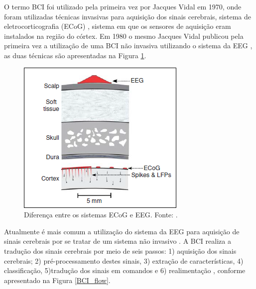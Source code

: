 O termo BCI foi utilizado pela primeira vez por Jacques Vidal em 1970, onde foram utilizadas técnicas invasivas para aquisição dos sinais cerebrais, sistema de eletrocorticografia (ECoG) \cite{BCIWolpaw}, sistema em que os sensores de aquisição eram instalados na região do córtex. Em 1980 o mesmo Jacques Vidal publicou pela primeira vez a utilização de uma BCI não invasiva utilizando o sistema da EEG \cite{CristophBCI}, as duas técnicas são apresentadas na Figura \ref{ECoGeEEG}.
\pagebreak


\begin{figure}[h]
	\centering
	\includegraphics[keepaspectratio=true,scale=1.0]{figuras/sistemas_de_aquisicao.PNG}
	\caption{Diferença entre os sistemas ECoG e EEG. Fonte: \cite{BCIWolpaw}.}
	\label{ECoGeEEG}
\end{figure}

Atualmente é mais comum a utilização do sistema da EEG para aquisição de sinais cerebrais por se tratar de um sistema não invasivo \cite{CristophBCI}. A BCI realiza a tradução dos sinais cerebrais por meio de seis passos: 1) aquisição dos sinais cerebrais; 2) pré-processamento destes sinais, 3) extração de características, 4) classificação, 5)tradução dos sinais em comandos e 6) realimentação \cite{MasonAndBirch}, conforme apresentado na Figura \ref{BCI_flow}.

